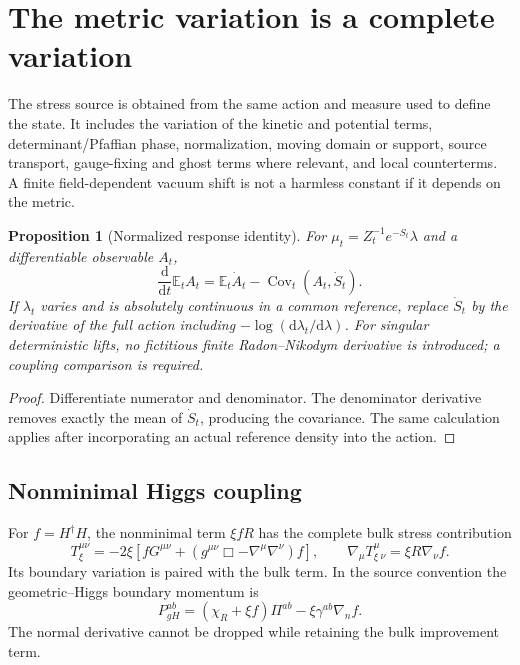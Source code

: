 \documentclass[11pt,a4paper,oneside]{book}
\theoremstyle{plain}
\newtheorem{proposition}[theorem]{Proposition}
\theoremstyle{definition}
\theoremstyle{remark}
\newcommand{\E}{\mathbb E}
\newcommand{\dd}{\mathrm d}
\newcommand{\Cov}{\operatorname{Cov}}
\newcommand{\src}[2]{\cite{#1}}
\begin{document}
\section{The metric variation is a complete variation}
The stress source is obtained from the same action and measure used to define the state. It includes the variation of the kinetic and potential terms, determinant/Pfaffian phase, normalization, moving domain or support, source transport, gauge-fixing and ghost terms where relevant, and local counterterms. A finite field-dependent vacuum shift is not a harmless constant if it depends on the metric.

\begin{proposition}[Normalized response identity]
\label{prop:normalized-response}
For $\mu_t=Z_t^{-1}e^{-S_t}\lambda$ and a differentiable observable $A_t$,
\begin{equation}
 \frac{\dd}{\dd t}\E_tA_t
 =\E_t\dot A_t-\Cov_t(A_t,\dot S_t).
 \label{eq:normalized-response}
\end{equation}
If $\lambda_t$ varies and is absolutely continuous in a common reference, replace $\dot S_t$ by the derivative of the full action including $-\log(\dd\lambda_t/\dd\lambda)$. For singular deterministic lifts, no fictitious finite Radon--Nikodym derivative is introduced; a coupling comparison is required.
\end{proposition}
\begin{proof}
Differentiate numerator and denominator. The denominator derivative removes exactly the mean of $\dot S_t$, producing the covariance. The same calculation applies after incorporating an actual reference density into the action.
\end{proof}
\cite{R2,R16}

\subsection{Nonminimal Higgs coupling}
For $f=H^\dagger H$, the nonminimal term $\xi fR$ has the complete bulk stress contribution
\begin{equation}
 T_\xi^{\mu\nu}=-2\xi\left[fG^{\mu\nu}
 +(g^{\mu\nu}\Box-\nabla^\mu\nabla^\nu)f\right],
 \qquad \nabla_\mu T_\xi^{\mu}{}_{\nu}=\xi R\nabla_\nu f.
 \label{eq:nonminimal}
\end{equation}
Its boundary variation is paired with the bulk term. In the source convention the geometric--Higgs boundary momentum is
\begin{equation}
 P_{gH}^{ab}=(\chi_R+\xi f)\Pi^{ab}-\xi\gamma^{ab}\nabla_nf.
 \label{eq:nonminimal-boundary}
\end{equation}
The normal derivative cannot be dropped while retaining the bulk improvement term. \src{R1}{thm:V150-Ixi-variation}
\end{document}
